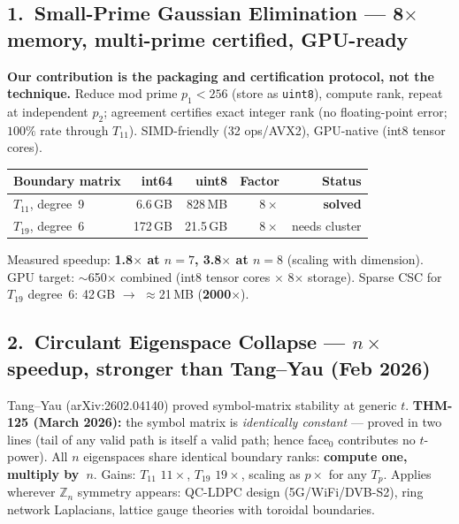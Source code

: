\documentclass[10pt,letterpaper]{article}
\begin{document}
\subsection*{1.\ Small-Prime Gaussian Elimination — 8$\times$ memory, multi-prime certified,
  GPU-ready}

\textbf{Our contribution is the packaging and certification protocol, not the technique.}
Reduce mod prime $p_1 < 256$ (store as \texttt{uint8}), compute rank, repeat at independent
$p_2$; agreement certifies exact integer rank (no floating-point error; $100\%$ rate through
$T_{11}$). SIMD-friendly (32 ops/AVX2), GPU-native (int8 tensor cores).

\vspace{2pt}
\begin{center}
\small
\begin{tabular}{lrrrr}
\toprule
Boundary matrix & int64 & uint8 & Factor & Status \\
\midrule
$T_{11}$, degree~9 & 6.6\,GB & 828\,MB & $8\times$ & \textbf{solved} \\
$T_{19}$, degree~6 & 172\,GB & 21.5\,GB & $8\times$ & needs cluster \\
\bottomrule
\end{tabular}
\end{center}
\vspace{2pt}

Measured speedup: \textbf{1.8$\times$ at $n=7$, 3.8$\times$ at $n=8$} (scaling with dimension).
GPU target: $\sim$650$\times$ combined (int8 tensor cores $\times$ 8$\times$ storage).
Sparse CSC for $T_{19}$ degree~6: 42\,GB $\to$ $\approx$21\,MB (\textbf{2000$\times$}).

\subsection*{2.\ Circulant Eigenspace Collapse — $n\times$ speedup, stronger than Tang--Yau (Feb 2026)}

Tang--Yau (arXiv:2602.04140) proved symbol-matrix stability at generic $t$.
\textbf{THM-125 (March 2026):} the symbol matrix is \emph{identically constant} —
proved in two lines (tail of any valid path is itself a valid path; hence face$_0$ contributes
no $t$-power). All $n$ eigenspaces share identical boundary ranks: \textbf{compute one, multiply
by~$n$}. Gains: $T_{11}$ $11\times$, $T_{19}$ $19\times$, scaling as $p\times$ for any $T_p$.
Applies wherever $\mathbb{Z}_n$ symmetry appears: QC-LDPC design (5G/WiFi/DVB-S2), ring
network Laplacians, lattice gauge theories with toroidal boundaries.
\end{document}
